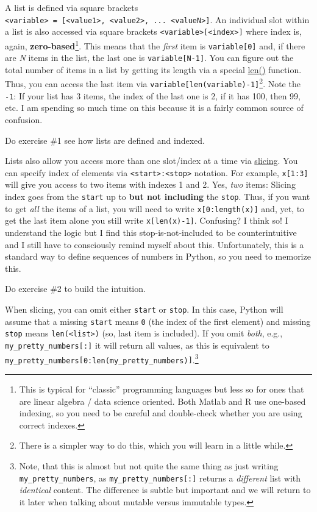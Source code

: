 \documentclass[
]{book}
\begin{document}
A list is defined via square brackets \texttt{\textless{}variable\textgreater{}\ =\ {[}\textless{}value1\textgreater{},\ \textless{}value2\textgreater{},\ ...\ \textless{}valueN\textgreater{}{]}}. An individual slot within a list is also accessed via square brackets \texttt{\textless{}variable\textgreater{}{[}\textless{}index\textgreater{}{]}} where index is, again, \textbf{zero-based}\footnote{This is typical for ``classic'' programming languages but less so for ones that are linear algebra / data science oriented. Both Matlab and R use one-based indexing, so you need to be careful and double-check whether you are using correct indexes.}. This means that the \emph{first} item is \texttt{variable{[}0{]}} and, if there are \emph{N} items in the list, the last one is \texttt{variable{[}N-1{]}}. You can figure out the total number of items in a list by getting its length via a special \href{https://docs.python.org/3/library/functions.html\#len}{len()} function. Thus, you can access the last item via \texttt{variable{[}len(variable)-1{]}}\footnote{There is a simpler way to do this, which you will learn in a little while.}. Note the \texttt{-1}: If your list has 3 items, the index of the last one is 2, if it has 100, then 99, etc. I am spending so much time on this because it is a fairly common source of confusion.

Do exercise \#1 see how lists are defined and indexed.

Lists also allow you access more than one slot/index at a time via \href{https://docs.python.org/3/library/functions.html\#slice}{slicing}. You can specify index of elements via \texttt{\textless{}start\textgreater{}:\textless{}stop\textgreater{}} notation. For example, \texttt{x{[}1:3{]}} will give you access to two items with indexes 1 and 2. Yes, \emph{two} items: Slicing index goes from the \texttt{start} up to \textbf{but not including} the \texttt{stop}. Thus, if you want to get \emph{all} the items of a list, you will need to write \texttt{x{[}0:length(x){]}} and, yet, to get the last item alone you still write \texttt{x{[}len(x)-1{]}}. Confusing? I think so! I understand the logic but I find this stop-is-not-included to be counterintuitive and I still have to consciously remind myself about this. Unfortunately, this is a standard way to define sequences of numbers in Python, so you need to memorize this.

Do exercise \#2 to build the intuition.

When slicing, you can omit either \texttt{start} or \texttt{stop}. In this case, Python will assume that a missing \texttt{start} means \texttt{0} (the index of the first element) and missing \texttt{stop} means \texttt{len(\textless{}list\textgreater{})} (so, last item is included). If you omit \emph{both}, e.g., \texttt{my\_pretty\_numbers{[}:{]}} it will return all values, as this is equivalent to \texttt{my\_pretty\_numbers{[}0:len(my\_pretty\_numbers){]}}.\footnote{Note, that this is almost but not quite the same thing as just writing \texttt{my\_pretty\_numbers}, as \texttt{my\_pretty\_numbers{[}:{]}} returns a \emph{different} list with \emph{identical} content. The difference is subtle but important and we will return to it later when talking about mutable versus immutable types.}
\end{document}
